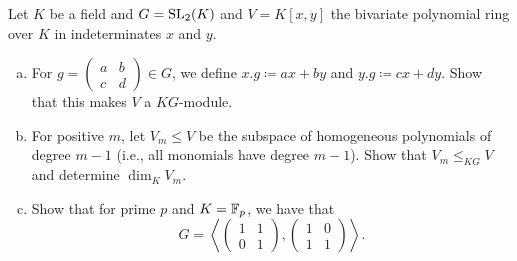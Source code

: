 \documentclass[leqno]{article}
\begin{document}
\newpage
\begin{problem}
Let $K$ be a field and $G=\mathrm{SL}_2(K)$ and $V=K[x,y]$ the bivariate polynomial ring over $K$ in indeterminates $x$ and $y$. 
\begin{enumerate}[(a)]
    \item For $g=\begin{pmatrix} a & b\\ c& d\end{pmatrix}\in G$, we define $x.g\coloneqq ax+by$ and $y.g\coloneqq cx+dy$. Show that this makes $V$ a $KG$-module. 
    \item For positive $m$, let $V_m\leq V$ be the subspace of homogeneous polynomials of degree $m-1$ (i.e., all monomials have degree $m-1$). Show that $V_m\leq_{KG}V$ and determine $\dim_K V_m$.
    \item Show that for prime $p$ and $K=\mathbb{F}_p$, we have that
    \[
    G=\left\langle \begin{pmatrix} 1 & 1 \\ 0 & 1\end{pmatrix}, \begin{pmatrix} 1 & 0 \\ 1 & 1 \end{pmatrix}\right\rangle.
    \]
\end{enumerate}
\end{problem}
\end{document}
